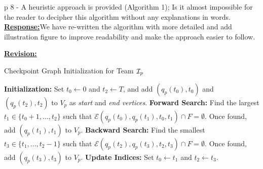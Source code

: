 \documentclass{article}
\newcommand{\re}{\tcblower \underline{\textbf{Response:}}\quad}
\newcommand{\rv}{{\large{\underline{\textbf{Revision:}}}}\quad}
\newcommand{\news}{\color{blue}}
\begin{document}
\begin{cmt}{}{}
	p 8 - A heuristic approach is provided (Algorithm 1); Is it
	almost impossible for the reader to decipher this algorithm without any
	explanations in words.
\re	We have re-written the algorithm with more detailed and add illustration figure to improve readability and make the approach easier to follow.
\end{cmt}
\rv  
\begin{algorithm}
	\caption{Checkpoint Graph Initialization for Team $\mathcal{I}_p$}\label{alg:graph}
	{\news \begin{algorithmic}[1]
	\State \textbf{Initialization:} Set $t_{0} \leftarrow 0$ and $t_{2} \leftarrow T$, and add $(q_{p}(t_0),t_0)$ and $(q_{p}(t_2),t_2)$ to $V_{p}$ as \emph{start} and \emph{end vertices}.
		\State \textbf{Forward Search:} Find the largest $t_{1} \in \{t_{0}+1, \dots, t_{2}\}$ such that $\mathcal{E}(q_{p}(t_{0}),q_{p}(t_{1}), t_{0},t_{1}) \cap F = \emptyset$. Once found, add $(q_{p}(t_{1}),t_{1})$ to $V_{p}$.
		\State \textbf{Backward Search:} Find the smallest $t_{3}\in\{t_{1}, \dots, t_{2}-1\}$ such that $
		\mathcal{E}(q_{p}(t_{2}),q_{p}(t_{3}), t_{2},t_{3}) \cap F = \emptyset.$ Once found, add $(q_{p}(t_{3}),t_{3})$ to $V_{p}$.
		\State \textbf{Update Indices:} Set $t_{0} \leftarrow t_{1}$ and $t_{2} \leftarrow t_{3}$.
	\EndWhile
	\end{algorithmic}}
	\end{algorithm}
	\setcounter{figure}{4}
	\begin{figure}[H]
		\centering
		\caption{\news{Checkpoint generation example}}\label{fig:checkpoint-generate}
	\end{figure}
\end{document}
